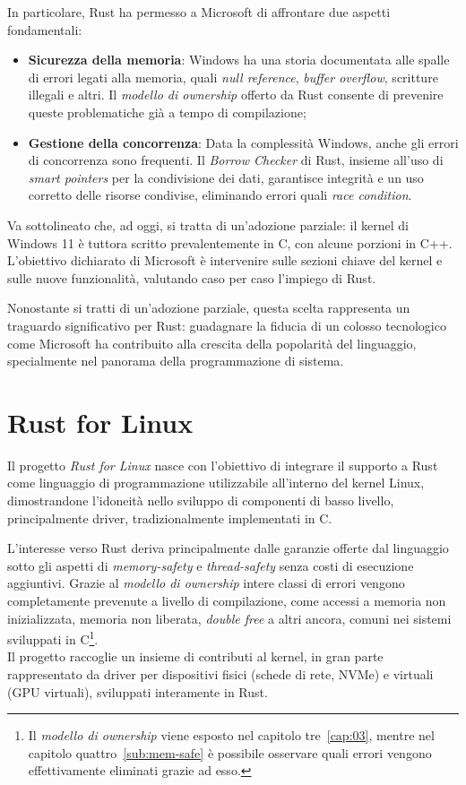 In particolare, Rust ha permesso a Microsoft di affrontare due aspetti fondamentali:
\begin{itemize}
    \item \textbf{Sicurezza della memoria}: Windows ha una storia documentata alle spalle di errori legati alla memoria, quali \textit{null reference}, \textit{buffer overflow}, scritture illegali e altri. Il \textit{modello di ownership} offerto da Rust consente di prevenire queste problematiche già a tempo di compilazione;
    \item \textbf{Gestione della concorrenza}: Data la complessità Windows, anche gli errori di concorrenza sono frequenti. Il \textit{Borrow Checker} di Rust, insieme all'uso di \textit{smart pointers} per la condivisione dei dati, garantisce integrità e un uso corretto delle risorse condivise, eliminando errori quali \textit{race condition}.
\end{itemize}
Va sottolineato che, ad oggi, si tratta di un'adozione parziale: il kernel di Windows 11 è tuttora scritto prevalentemente in C, con alcune porzioni in C++.
L'obiettivo dichiarato di Microsoft è intervenire sulle sezioni chiave del kernel e sulle nuove funzionalità, valutando caso per caso l'impiego di Rust.

Nonostante si tratti di un'adozione parziale, questa scelta rappresenta un traguardo significativo per Rust: guadagnare la fiducia
di un colosso tecnologico come Microsoft ha contribuito alla crescita della popolarità del linguaggio, specialmente nel panorama della programmazione di sistema.

\section{Rust for Linux}
Il progetto \textit{Rust for Linux} nasce con l'obiettivo di integrare il supporto a Rust 
come linguaggio di programmazione utilizzabile all'interno del kernel Linux, dimostrandone l'idoneità nello 
sviluppo di componenti di basso livello, principalmente driver, tradizionalmente 
implementati in C.

L'interesse verso Rust deriva principalmente dalle garanzie offerte dal linguaggio sotto gli aspetti di \textit{memory-safety} e \textit{thread-safety} senza
costi di esecuzione aggiuntivi. Grazie al \textit{modello di ownership} intere classi di errori vengono completamente prevenute a livello di compilazione,
come accessi a memoria non inizializzata, memoria non liberata, \textit{double free} a altri ancora, comuni nei sistemi sviluppati in C\footnote{Il \textit{modello di ownership} viene 
esposto nel capitolo tre~\ref{cap:03}, mentre nel capitolo quattro~\ref{sub:mem-safe} è possibile osservare quali errori vengono effettivamente 
eliminati grazie ad esso.}. \hfill 
\vspace{7pt} \\
\noindent Il progetto raccoglie un insieme di contributi al kernel, in gran parte rappresentato da driver per dispositivi fisici
(schede di rete, NVMe) e virtuali (GPU virtuali), sviluppati interamente in Rust.

